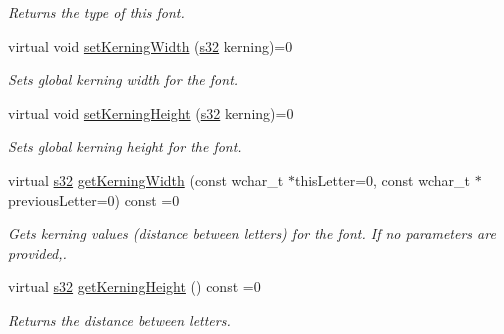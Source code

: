 \begin{DoxyCompactItemize}
\begin{DoxyCompactList}\small\item\em Returns the type of this font. \end{DoxyCompactList}\item 
\mbox{\label{classirr_1_1gui_1_1IGUIFont_aa683bb2535776b7f81adc050931d9b17}} 
virtual void \hyperlink{classirr_1_1gui_1_1IGUIFont_aa683bb2535776b7f81adc050931d9b17}{set\+Kerning\+Width} (\hyperlink{namespaceirr_ac66849b7a6ed16e30ebede579f9b47c6}{s32} kerning)=0
\begin{DoxyCompactList}\small\item\em Sets global kerning width for the font. \end{DoxyCompactList}\item 
\mbox{\label{classirr_1_1gui_1_1IGUIFont_a9545ecfae06592acd47508f6824bb386}} 
virtual void \hyperlink{classirr_1_1gui_1_1IGUIFont_a9545ecfae06592acd47508f6824bb386}{set\+Kerning\+Height} (\hyperlink{namespaceirr_ac66849b7a6ed16e30ebede579f9b47c6}{s32} kerning)=0
\begin{DoxyCompactList}\small\item\em Sets global kerning height for the font. \end{DoxyCompactList}\item 
virtual \hyperlink{namespaceirr_ac66849b7a6ed16e30ebede579f9b47c6}{s32} \hyperlink{classirr_1_1gui_1_1IGUIFont_a7de0b25d3d1dbdcc9036e5d788e2d9ab}{get\+Kerning\+Width} (const wchar\+\_\+t $\ast$this\+Letter=0, const wchar\+\_\+t $\ast$previous\+Letter=0) const =0
\begin{DoxyCompactList}\small\item\em Gets kerning values (distance between letters) for the font. If no parameters are provided,. \end{DoxyCompactList}\item 
\mbox{\label{classirr_1_1gui_1_1IGUIFont_a1f1a760be155fc0f6a632b457154a5d8}} 
virtual \hyperlink{namespaceirr_ac66849b7a6ed16e30ebede579f9b47c6}{s32} \hyperlink{classirr_1_1gui_1_1IGUIFont_a1f1a760be155fc0f6a632b457154a5d8}{get\+Kerning\+Height} () const =0
\begin{DoxyCompactList}\small\item\em Returns the distance between letters. \end{DoxyCompactList}\item 

\end{DoxyCompactItemize}
